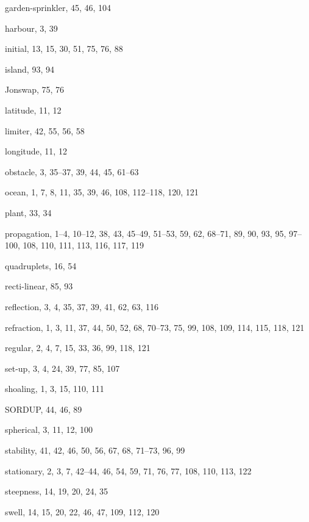 \documentclass[12pt]{book}
\begin{document}
\begin{theindex}
  \indexspace

  \item garden-sprinkler, 45, 46, 104

  \indexspace

  \item harbour, 3, 39

  \indexspace

  \item initial, 13, 15, 30, 51, 75, 76, 88
  \item island, 93, 94

  \indexspace

  \item Jonswap, 75, 76

  \indexspace

  \item latitude, 11, 12
  \item limiter, 42, 55, 56, 58
  \item longitude, 11, 12

  \indexspace

  \item obstacle, 3, 35--37, 39, 44, 45, 61--63
  \item ocean, 1, 7, 8, 11, 35, 39, 46, 108, 112--118, 120, 121

  \indexspace

  \item plant, 33, 34
  \item propagation, 1--4, 10--12, 38, 43, 45--49, 51--53, 59, 62,
		68--71, 89, 90, 93, 95, 97--100, 108, 110, 111, 113,
		116, 117, 119

  \indexspace

  \item quadruplets, 16, 54

  \indexspace

  \item recti-linear, 85, 93
  \item reflection, 3, 4, 35, 37, 39, 41, 62, 63, 116
  \item refraction, 1, 3, 11, 37, 44, 50, 52, 68, 70--73, 75, 99,
		108, 109, 114, 115, 118, 121
  \item regular, 2, 4, 7, 15, 33, 36, 99, 118, 121

  \indexspace

  \item set-up, 3, 4, 24, 39, 77, 85, 107
  \item shoaling, 1, 3, 15, 110, 111
  \item SORDUP, 44, 46, 89
  \item spherical, 3, 11, 12, 100
  \item stability, 41, 42, 46, 50, 56, 67, 68, 71--73, 96, 99
  \item stationary, 2, 3, 7, 42--44, 46, 54, 59, 71, 76, 77, 108, 110,
		113, 122
  \item steepness, 14, 19, 20, 24, 35
  \item swell, 14, 15, 20, 22, 46, 47, 109, 112, 120


\end{theindex}
\end{document}
